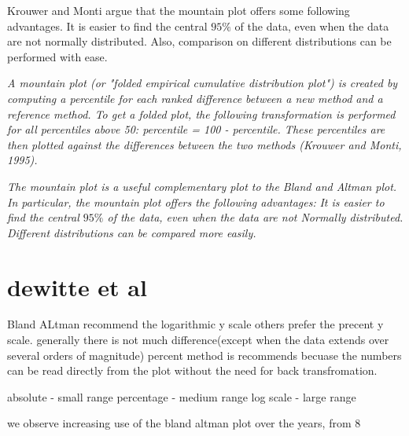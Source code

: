 \documentclass[12pt, a4paper]{article}
\begin{document}
Krouwer and Monti argue that the mountain plot offers some following advantages. It is easier to find the central $95\%$ of the data, even when the data are not normally distributed. Also, comparison on different distributions can be performed with ease.

\emph{
A mountain plot (or "folded empirical cumulative distribution plot") is created by computing a percentile for each ranked difference between a new method and a reference method. To get a folded plot, the following transformation is performed for all percentiles above 50: percentile = 100 - percentile. These percentiles are then plotted against the differences between the two methods (Krouwer and Monti, 1995).}

\emph{
The mountain plot is a useful complementary plot to the Bland and Altman plot. In particular, the mountain plot offers the following advantages:}
\emph{
It is easier to find the central $95\%$ of the data, even when the data are not Normally distributed.
Different distributions can be compared more easily.
}

\section{dewitte et al }
Bland ALtman recommend the logarithmic y scale
others prefer the  precent y scale.
generally there is not much difference(except when the data extends over several orders of magnitude)
percent method is recommends becuase the numbers can be read directly from the plot without the need for back transfromation.

absolute - small range
percentage - medium range
log scale - large range

we observe increasing use of the bland altman plot over the years, from 8%







\end{document}
